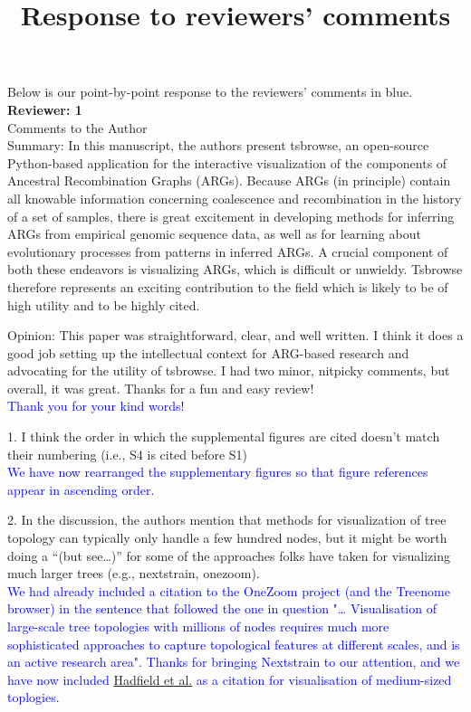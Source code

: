 \documentclass{article}
\title{Response to reviewers' comments}
\begin{document}
\maketitle

Below is our point-by-point response to the reviewers' comments in blue.\\

\textbf{Reviewer: 1}\\

Comments to the Author \\

Summary: In this manuscript, the authors present tsbrowse, an open-source Python-based 
application for the interactive visualization of the components of Ancestral Recombination 
Graphs (ARGs). Because ARGs (in principle) contain all knowable information concerning 
coalescence and recombination in the history of a set of samples, there is great excitement 
in developing methods for inferring ARGs from empirical genomic sequence data, as well as 
for learning about evolutionary processes from patterns in inferred ARGs. A crucial component 
of both these endeavors is visualizing ARGs, which is difficult or unwieldy. Tsbrowse therefore 
represents an exciting contribution to the field which is likely to be of high utility and 
to be highly cited.

Opinion: This paper was straightforward, clear, and well written. I think it does a good job 
setting up the intellectual context for ARG-based research and advocating for the utility of 
tsbrowse. I had two minor, nitpicky comments, but overall, it was great. Thanks for a fun and 
easy review!\\
\textcolor{blue}{Thank you for your kind words!}

1. I think the order in which the supplemental figures are cited doesn’t match their numbering 
(i.e., S4 is cited before S1)\\
\textcolor{blue}{We have now rearranged the supplementary figures so that figure references 
appear in ascending order.}

2. In the discussion, the authors mention that methods for visualization of tree topology can 
typically only handle a few hundred nodes, but it might be worth doing a ``(but see…)'' for some 
of the approaches folks have taken for visualizing much larger trees (e.g., nextstrain, onezoom).\\
\textcolor{blue}{We had already included a citation to the OneZoom project (and the Treenome browser) in the 
sentence that followed the one in question "… Visualisation of large-scale tree topologies with millions of nodes 
requires much more sophisticated approaches to capture topological features at different scales, 
and is an active research area". Thanks for bringing Nextstrain to our 
attention, and we have now included \href{{Wong et al 2024}}{Hadfield et al.} as a citation for visualisation of 
medium-sized toplogies.}\\
\end{document}
